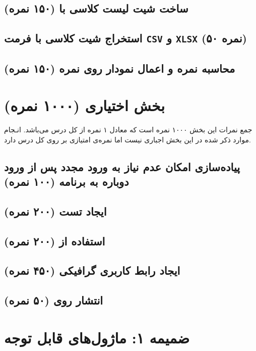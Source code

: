 \documentclass[a4paper]{report}
\begin{document}
\section{ساخت شیت لیست کلاسی با  (۱۵۰ نمره)}


\section{استخراج شیت کلاسی با فرمت \texttt{CSV} و \texttt{XLSX} (۵۰ نمره)}


\section{محاسبه نمره و اعمال نمودار روی نمره (۱۵۰ نمره)}


\chapter{بخش اختیاری (۱۰۰۰ نمره)}
\begin{center}
    \begin{warningbox}
        \Large
        جمع نمرات این بخش ۱۰۰۰ نمره است که معادل ۱ نمره از کل درس می‌باشد.
        انـجام موارد ذکر شده در این بخش اجباری نیست اما نمره‌ی امتیازی بر روی کل درس دارد.
    \end{warningbox}
\end{center}

\section{پیاده‌سازی امکان عدم نیاز به ورود مجدد پس از ورود دوباره به برنامه (۱۰۰ نمره)}


\section{ایجاد تست  (۲۰۰ نمره)}


\section{استفاده از  (۲۰۰ نمره)}


\section{ایجاد رابط کاربری گرافیکی (۴۵۰ نمره)}


\section{انتشار روی  (۵۰ نمره)}


\chapter{ضمیمه ۱: ماژول‌های قابل توجه}
\end{document}

